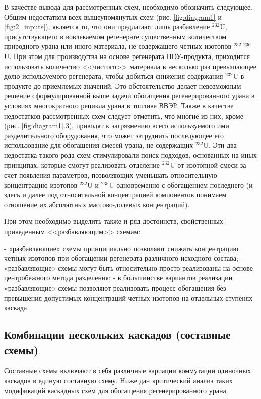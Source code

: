 В качестве вывода для рассмотренных схем, необходимо обозначить следующее. Общим недостатком всех вышеупомянутых схем (рис. \ref{fig:diagram1} и \ref{fig:2_inputs}), является то, что они предлагают лишь разбавление $^{232}$U, присутствующего в вовлекаемом регенерате существенным количеством природного урана или иного материала, не содержащего четных изотопов $^{232,236}$U. При этом для производства на основе регенерата НОУ-продукта, приходится использовать количество <<чистого>> материала в несколько раз превышающее долю используемого регенерата, чтобы добиться снижения содержания $^{232}$U в продукте до приемлемых значений. Это обстоятельство делает невозможным решение сформулированной выше задачи обогащения регенерированного урана в условиях многократного рецикла урана в топливе ВВЭР. Также в качестве недостатков рассмотренных схем следует отметить, что многие из них, кроме (рис. \ref{fig:diagram1}.3), приводят к загрязнению всего используемого ими разделительного оборудования, что может затруднить последующее его использование для обогащения смесей урана, не содержащих $^{232}$U. Эти два недостатка такого рода схем стимулировали поиск подходов, основанных на иных принципах, которые смогут реализовать отделение $^{232}$U от изотопной смеси за счет появления параметров, позволяющих уменьшать относительную концентрацию изотопов  $^{232}$U и  $^{235}$U одновременно с обогащением последнего (и здесь и далее под относительной концентрацией компонентов понимаем отношение их абсолютных массово-долевых концентраций).


При этом необходимо выделить также и ряд достоинств, свойственных приведенным <<разбавляющим>> схемам:

-	«разбавляющие» схемы принципиально позволяют снижать концентрацию четных изотопов при обогащении регенерата различного исходного состава;
-	«разбавляющие» схемы могут быть относительно просто реализованы на основе центробежного метода разделения;
-	в большинстве вариантов реализации «разбавляющие» схемы позволяют реализовать процесс обогащения без превышения допустимых концентраций четных изотопов на отдельных ступенях каскада.


\subsection{Комбинации нескольких каскадов (составные схемы)}\label{sec:ch1/sec2.3}
Составные схемы включают в себя различные вариации коммутации одиночных каскадов в единую составную схему.
Ниже дан критический анализ таких модификаций каскадных схем для обогащения регенерированного урана.

